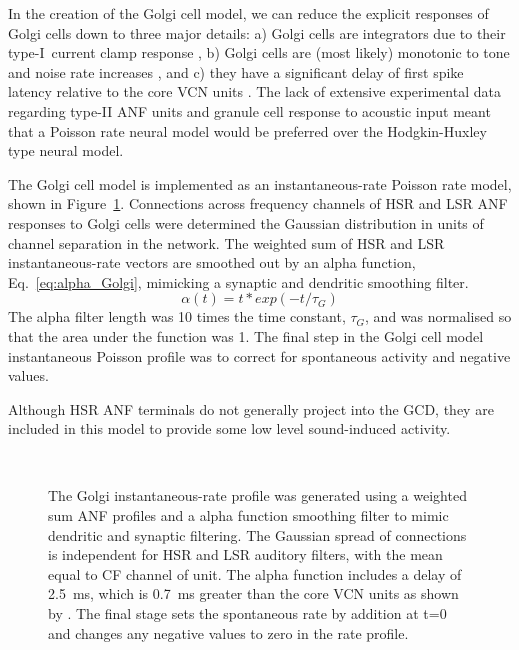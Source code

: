In the creation of the Golgi cell model, we can reduce the explicit responses of
Golgi cells down to three major details: a) Golgi cells are integrators due to
their type-I~current clamp response \citep{FerragamoGoldingEtAl:1998}, b) Golgi
cells are (most likely) monotonic to tone and noise rate increases
\citep{GhoshalKim:1997}, and c) they have a significant delay of first spike
latency relative to the core VCN units \citep{GhoshalKim:1997}. The lack of
extensive experimental data regarding type-II ANF units and granule cell
response to acoustic input meant that a Poisson rate neural model would be
preferred over the Hodgkin-Huxley type neural model.  %

The Golgi cell model is implemented as an instantaneous-rate Poisson rate model,
shown in Figure~\ref{fig:GolgiDiagram}. Connections across frequency channels of
HSR and LSR ANF responses to Golgi cells were determined the Gaussian
distribution in units of channel separation in the network. The weighted sum of
HSR and LSR instantaneous-rate vectors are smoothed out by an alpha function,
Eq.~\ref{eq:alpha_Golgi}, mimicking a synaptic and dendritic smoothing filter.
\begin{equation}\label{eq:alpha_Golgi}
  \alpha(t)=t*exp(-t/\tau_{G})
\end{equation}
The alpha filter length was 10 times the time constant, $\tau_{G}$, and was
normalised so that the area under the function was 1. The final step in the Golgi cell model instantaneous Poisson profile was to correct for spontaneous activity and negative values.

Although HSR ANF terminals do not generally project into the GCD, they are
included in this model to provide some low level sound-induced activity.

\begin{figure}[h!]
  \centering
  \\
  \caption{The Golgi instantaneous-rate profile was generated using a weighted
    sum ANF profiles and a alpha function smoothing filter to mimic dendritic
    and synaptic filtering. The Gaussian spread of connections is independent
    for HSR and LSR auditory filters, with the mean equal to CF channel of
    unit. The alpha function includes a delay of 2.5~ms, which is 0.7~ms greater
    than the core VCN units as shown by \citet{GhoshalKim:1997}. The final stage
    sets the spontaneous rate by addition at t=0 and changes any negative values
    to zero in the rate profile. }
  \label{fig:GolgiDiagram}
\end{figure}

